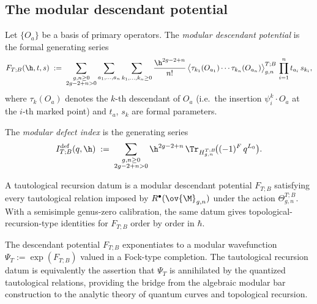 \subsection{The modular descendant potential}
\label{subsec:modular-descendant-potential}

\begin{definition}
\label{def:modular-descendant-potential}
Let $\{O_a\}$ be a basis of primary operators. The \emph{modular descendant potential}
is the formal generating series
\begin{equation}
\label{eq:modular-descendant-potential}
F_{T;B}(\h,t,s)
\;:=\;
\sum_{\substack{g,n \geq 0 \\ 2g-2+n > 0}}
\sum_{a_1,\dots,a_n}
\sum_{k_1,\dots,k_n \geq 0}
\frac{\h^{2g-2+n}}{n!}\,
\bigl\langle \tau_{k_1}(O_{a_1}) \cdots \tau_{k_n}(O_{a_n})
\bigr\rangle_{g,n}^{T;B}\,
\prod_{i=1}^n t_{a_i}\,s_{k_i},
\end{equation}
where $\tau_k(O_a)$ denotes the $k$-th descendant of $O_a$ (i.e.\ the insertion
$\psi_i^k \cdot O_a$ at the $i$-th marked point) and $t_a$, $s_k$ are formal parameters.
\end{definition}

\begin{definition}
\label{def:modular-defect-index}
The \emph{modular defect index} is the generating series
\begin{equation}
\label{eq:modular-defect-index}
I_{T;B}^{\mathrm{def}}(q,\h)
\;:=\;
\sum_{\substack{g,n \geq 0 \\ 2g-2+n > 0}}
\h^{2g-2+n}\,
\Tr_{H_{g,n}^{T;B}}\!\bigl((-1)^F\,q^{L_0}\bigr).
\end{equation}
\end{definition}

\begin{definition}
\label{def:tautological-recursion}
A tautological recursion datum is a modular descendant potential
$F_{T;B}$ satisfying every tautological relation imposed by
$R^\bullet(\ov{\M}_{g,n})$ under the action $\Theta_{g,n}^{T;B}$.
With a semisimple genus-zero calibration, the same datum gives
topological-recursion-type identities for $F_{T;B}$ order by order in
\(\hbar\).
\end{definition}

\begin{remark}
\label{rem:descendant-wavefunction}
The descendant potential $F_{T;B}$ exponentiates to a modular wavefunction
$\Psi_T := \exp(F_{T;B})$ valued in a Fock-type completion. The tautological recursion
datum is equivalently the assertion that $\Psi_T$ is annihilated by the quantized tautological
relations, providing the bridge from the algebraic modular bar construction to the
analytic theory of quantum curves and topological recursion.
\end{remark}

